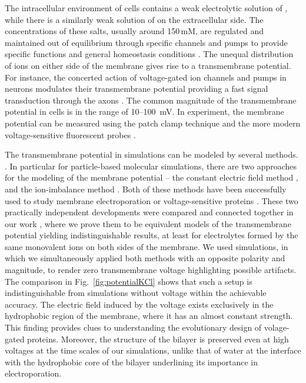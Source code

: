 The intracellular environment of cells contains a weak electrolytic solution of , 
while there is a similarly weak solution of  on the extracellular side. 
The concentrations of these salts, usually around 150\,mM, 
are regulated and maintained out of equilibrium through specific channels and pumps 
to provide specific functions and general homeostasis conditions \citep{Bezanilla2008, Knudsen_book2002}. 
The unequal distribution of ions on either side of the membrane
gives rise to a transmembrane potential. 
For instance, the concerted action of voltage-gated ion channels and pumps in neurons 
modulates their transmembrane potential
providing a fast signal transduction through the axons \citep{Knudsen_book2002, Storace2015, Sung2015}. 
The common magnitude of the transmembrane potential in cells is in the range of 10--100~mV. 
In experiment, the membrane potential can be measured using the patch clamp technique \citep{Bezanilla2008}
and the more modern voltage-sensitive fluorescent probes \citep{Storace2015, Sung2015}. 

The transmembrane potential in simulations can be modeled by several methods. \citep{Tieleman2001,Sin2015, Roux1997, sachs04_potential}.
In particular for particle-based molecular simulations, 
there are two approaches for the modeling of the membrane potential --
 the constant electric field method \citep{Roux1997,Roux2008,gumbart_constant_2012}, 
and
 the ion-imbalance method \citep{sachs04_potential,Delemotte2008}. 
Both of these methods have been successfully used to study membrane electroporation or voltage-sensitive proteins \citep{Vargas2012, bockmann_kinetics_2008, gumbart_constant_2012, kutzner_computational_2011, casciola_molecular_2014}. 
These two practically independent developments were compared and connected together in our work \citep{melcr16},
where we prove them to be equivalent models of the transmembrane potential yielding indistinguishable results, 
at least for electrolytes formed by the same monovalent ions on both sides of the membrane. 
We used simulations, 
in which we simultaneously applied both methods
with an opposite polarity and magnitude, 
to render zero transmembrane voltage
highlighting possible artifacts. 
The comparison in Fig.~\ref{fig:potentialKCl} shows 
that such a setup is indistinguishable 
from simulations without voltage within the achievable accuracy. 
The electric field induced by the voltage 
exists exclusively in the hydrophobic region of the membrane,
where it has an almost constant strength. 
This finding provides clues to understanding the evolutionary design of volage-gated proteins. \citep{Vargas2012} 
Moreover,
the structure of the bilayer is preserved even at high voltages at the time scales of our simulations,
unlike that of water at the interface with the hydrophobic core of the bilayer
underlining its importance in electroporation. \citep{bu2017mechanics}

